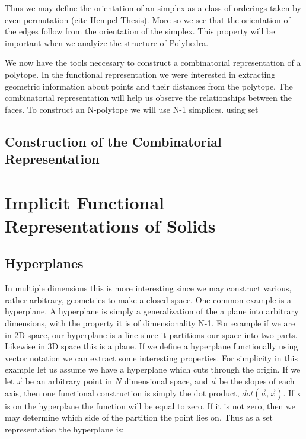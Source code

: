 Thus we may define the orientation of an simplex as a class of orderings taken
by even permutation (cite Hempel Thesis). More so we see that the orientation
of the edges follow from the orientation of the simplex. This property
will be important when we analyize the structure of Polyhedra.



\cite{Lee_2011}

We now have the tools neccesary to construct a combinatorial representation
of a polytope. In the functional representation we were interested in
extracting geometric information about points and their distances from the
polytope. The combinatorial representation will help us observe the
relationships between the faces. To construct an N-polytope we will use 
N-1 simplices. using set 


\subsection{Construction of the Combinatorial Representation}


\section{Implicit Functional Representations of Solids}

\subsection{Hyperplanes}

In multiple dimensions this is more interesting since we may construct
various, rather arbitrary, geometries to make a closed space.
One common example is a hyperplane. A hyperplane is simply a generalization
of the a plane into arbitrary dimensions, with the property it is
of dimensionality N-1. For example if we are in 2D space, our hyperplane
is a line since it partitions our space into two parts. Likewise in 3D
space this is a plane. If we define a hyperplane functionally using vector
notation we can extract some interesting properties.
For simplicity in this example let us assume we have a hyperplane which
cuts through the origin.
If we let 
$\vec{x}$ be an arbitrary point in $N$ dimensional space,
and $\vec{a}$ be the slopes of each axis, then one functional construction is
simply the dot product, $dot(\vec{a},\vec{x})$. If x is on the hyperplane
the function will be equal to zero. If it is not zero,
then we may determine which side of the partition the point lies on.
Thus as a set representation the hyperplane is:


